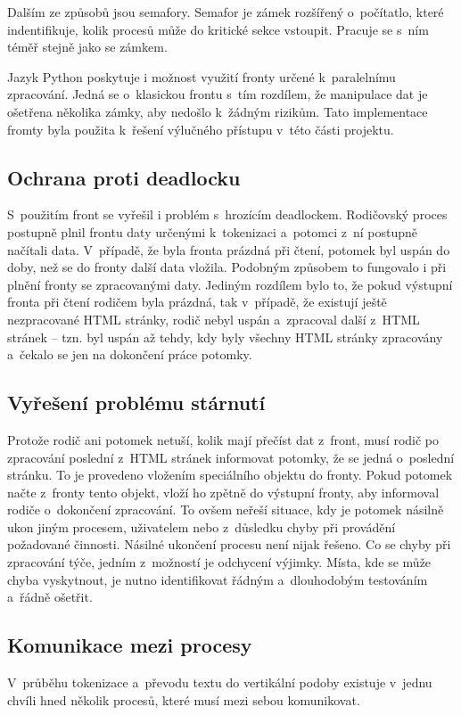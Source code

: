 Dalším ze způsobů jsou semafory. Semafor je zámek rozšířený o~počítatlo, které indentifikuje, kolik procesů může
do kritické sekce vstoupit. Pracuje se s~ním téměř stejně jako se zámkem.

Jazyk Python poskytuje i možnost využití fronty určené k~paralelnímu zpracování. Jedná se o~klasickou frontu s~tím
rozdílem, že manipulace dat je ošetřena několika zámky, aby nedošlo k~žádným rizikům. Tato implementace fromty byla
použita k~řešení výlučného přístupu v~této části projektu.

\subsection{Ochrana proti deadlocku}
S~použitím front se vyřešil i problém s~hrozícím deadlockem. Rodičovský proces postupně plnil frontu daty určenými
k~tokenizaci a~potomci z~ní postupně načítali data. V~případě, že byla fronta prázdná při čtení, potomek byl uspán
do doby, než se do fronty další data vložila. Podobným způsobem to fungovalo i při plnění fronty se zpracovanými
daty. Jediným rozdílem bylo to, že pokud výstupní fronta při čtení rodičem byla prázdná, tak v~případě, že existují
ještě nezpracované HTML stránky, rodič nebyl uspán a~zpracoval další z~HTML stránek -- tzn. byl uspán až tehdy,
kdy byly všechny HTML stránky zpracovány a~čekalo se jen na dokončení práce potomky.

\subsection{Vyřešení problému stárnutí}
Protože rodič ani potomek netuší, kolik mají přečíst dat z~front, musí rodič po zpracování poslední z~HTML stránek
informovat potomky, že se jedná o~poslední stránku. To je provedeno vložením speciálního objektu do fronty. Pokud potomek
načte z~fronty tento objekt, vloží ho zpětně do výstupní fronty, aby informoval rodiče o~dokončení zpracování. To ovšem
neřeší situace, kdy je potomek násilně ukon jiným procesem, uživatelem nebo z~důsledku chyby při provádění požadované
činnosti. Násilné ukončení procesu není nijak řešeno. Co se chyby při zpracování týče, jedním z~možností je odchycení výjimky.
Místa, kde se může chyba vyskytnout, je nutno identifikovat řádným a~dlouhodobým testováním a~řádně ošetřit.

\subsection{Komunikace mezi procesy}
V~průběhu tokenizace a~převodu textu do vertikální podoby existuje v~jednu chvíli hned několik procesů, které musí
mezi sebou komunikovat.

